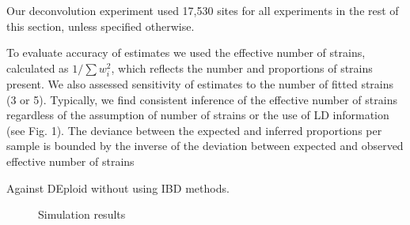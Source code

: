 \documentclass[9pt,lineno]{elife}
\begin{document}
Our deconvolution experiment used 17,530 sites for all experiments in the rest of this section, unless specified otherwise.

To evaluate accuracy of estimates we used the effective number of strains, calculated as $1/\sum w_{i}^{2}$, which reflects the number and proportions of strains present. We also assessed sensitivity of estimates to the number of fitted strains (3 or 5). Typically, we find consistent inference of the effective number of strains regardless of the assumption of number of strains or the use of LD information (see Fig. 1). The deviance between the expected and inferred proportions per sample is bounded by the inverse of the deviation between expected and observed effective number of strains


Against DEploid without using IBD methods.
\begin{figure}[htp]
  \centering{}
  \caption{Simulation results}
\end{figure}
\end{document}
